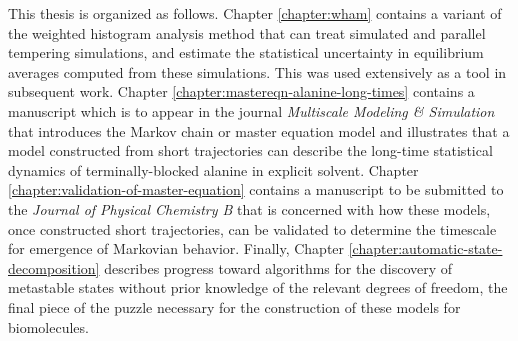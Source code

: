 This thesis is organized as follows.
Chapter \ref{chapter:wham} contains a variant of the weighted histogram analysis method that can treat simulated and parallel tempering simulations, and estimate the statistical uncertainty in equilibrium averages computed from these simulations.
This was used extensively as a tool in subsequent work.
Chapter \ref{chapter:mastereqn-alanine-long-times} contains a manuscript which is to appear in the journal \emph{Multiscale Modeling \& Simulation} that introduces the Markov chain or master equation model and illustrates that a model constructed from short trajectories can describe the long-time statistical dynamics of terminally-blocked alanine in explicit solvent.
Chapter \ref{chapter:validation-of-master-equation} contains a manuscript to be submitted to the \emph{Journal of Physical Chemistry B} that is concerned with how these models, once constructed short trajectories, can be validated to determine the timescale for emergence of Markovian behavior.
Finally, Chapter \ref{chapter:automatic-state-decomposition} describes progress toward algorithms for the discovery of metastable states without prior knowledge of the relevant degrees of freedom, the final piece of the puzzle necessary for the construction of these models for biomolecules.

